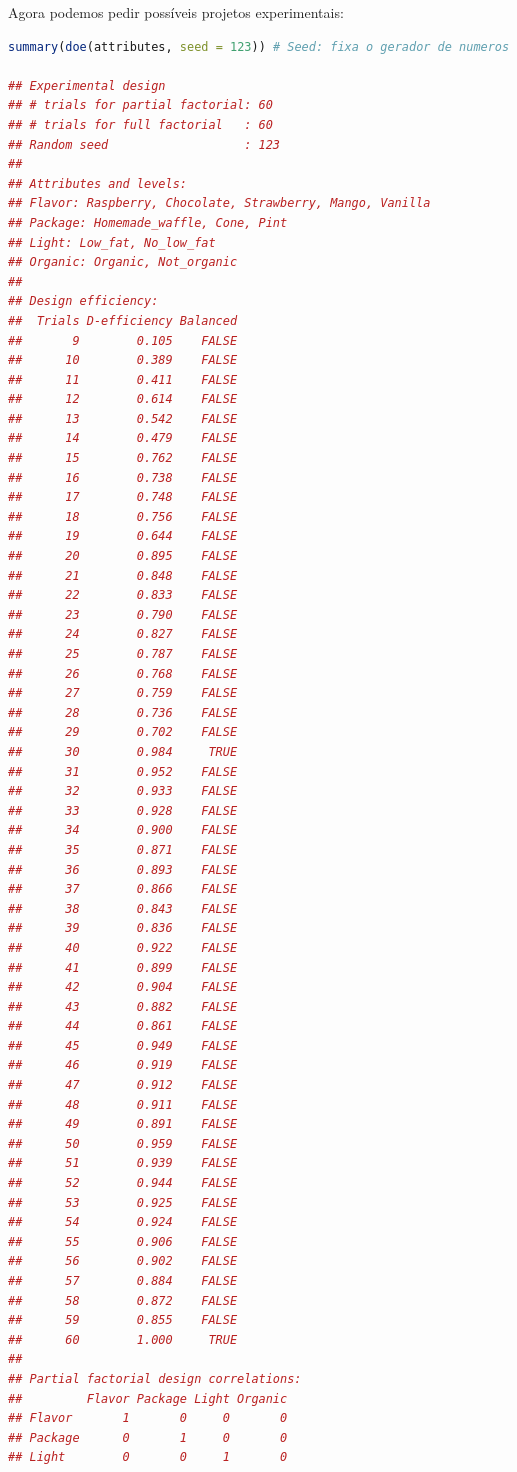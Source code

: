 \documentclass{article}
\begin{document}
Agora podemos pedir possíveis projetos experimentais:

\begin{lstlisting}[language=R]
summary(doe(attributes, seed = 123)) # Seed: fixa o gerador de numeros aleatorios

## Experimental design
## # trials for partial factorial: 60 
## # trials for full factorial   : 60 
## Random seed                   : 123 
## 
## Attributes and levels:
## Flavor: Raspberry, Chocolate, Strawberry, Mango, Vanilla 
## Package: Homemade_waffle, Cone, Pint 
## Light: Low_fat, No_low_fat 
## Organic: Organic, Not_organic 
## 
## Design efficiency:
##  Trials D-efficiency Balanced
##       9        0.105    FALSE
##      10        0.389    FALSE
##      11        0.411    FALSE
##      12        0.614    FALSE
##      13        0.542    FALSE
##      14        0.479    FALSE
##      15        0.762    FALSE
##      16        0.738    FALSE
##      17        0.748    FALSE
##      18        0.756    FALSE
##      19        0.644    FALSE
##      20        0.895    FALSE
##      21        0.848    FALSE
##      22        0.833    FALSE
##      23        0.790    FALSE
##      24        0.827    FALSE
##      25        0.787    FALSE
##      26        0.768    FALSE
##      27        0.759    FALSE
##      28        0.736    FALSE
##      29        0.702    FALSE
##      30        0.984     TRUE
##      31        0.952    FALSE
##      32        0.933    FALSE
##      33        0.928    FALSE
##      34        0.900    FALSE
##      35        0.871    FALSE
##      36        0.893    FALSE
##      37        0.866    FALSE
##      38        0.843    FALSE
##      39        0.836    FALSE
##      40        0.922    FALSE
##      41        0.899    FALSE
##      42        0.904    FALSE
##      43        0.882    FALSE
##      44        0.861    FALSE
##      45        0.949    FALSE
##      46        0.919    FALSE
##      47        0.912    FALSE
##      48        0.911    FALSE
##      49        0.891    FALSE
##      50        0.959    FALSE
##      51        0.939    FALSE
##      52        0.944    FALSE
##      53        0.925    FALSE
##      54        0.924    FALSE
##      55        0.906    FALSE
##      56        0.902    FALSE
##      57        0.884    FALSE
##      58        0.872    FALSE
##      59        0.855    FALSE
##      60        1.000     TRUE
## 
## Partial factorial design correlations:
##         Flavor Package Light Organic
## Flavor       1       0     0       0
## Package      0       1     0       0
## Light        0       0     1       0

\end{lstlisting}
\end{document}
